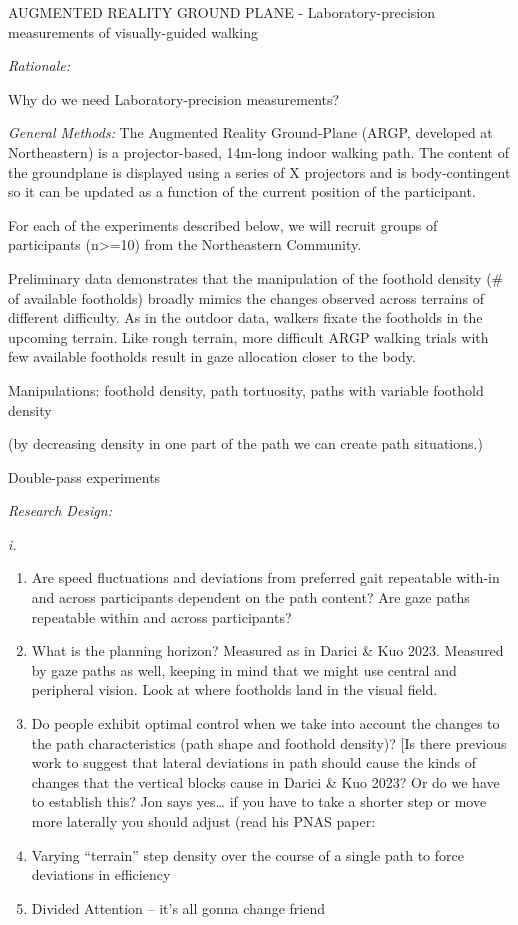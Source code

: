 AUGMENTED REALITY GROUND PLANE - Laboratory-precision measurements of
visually-guided walking

\emph{Rationale:}

Why do we need Laboratory-precision measurements?

\emph{General Methods:} The Augmented Reality Ground-Plane (ARGP,
developed at Northeastern) is a projector-based, 14m-long indoor walking
path. The content of the groundplane is displayed using a series of X
projectors and is body-contingent so it can be updated as a function of
the current position of the participant.

For each of the experiments described below, we will recruit groups of
participants (n\textgreater=10) from the Northeastern Community.

Preliminary data demonstrates that the manipulation of the foothold
density (\# of available footholds) broadly mimics the changes observed
across terrains of different difficulty. As in the outdoor data, walkers
fixate the footholds in the upcoming terrain. Like rough terrain, more
difficult ARGP walking trials with few available footholds result in
gaze allocation closer to the body.

Manipulations: foothold density, path tortuosity, paths with variable
foothold density

(by decreasing density in one part of the path we can create path
situations.)

Double-pass experiments

\emph{Research Design:}

\emph{i.}

\begin{enumerate}
\def\labelenumi{\Alph{enumi}.}
\item
  Are speed fluctuations and deviations from preferred gait repeatable
  with-in and across participants dependent on the path content? Are
  gaze paths repeatable within and across participants?
\item
  What is the planning horizon? Measured as in Darici \& Kuo 2023.
  Measured by gaze paths as well, keeping in mind that we might use
  central and peripheral vision. Look at where footholds land in the
  visual field.
\item
  Do people exhibit optimal control when we take into account the
  changes to the path characteristics (path shape and foothold density)?
  {[}Is there previous work to suggest that lateral deviations in path
  should cause the kinds of changes that the vertical blocks cause in
  Darici \& Kuo 2023? Or do we have to establish this? Jon says
  yes\ldots{} if you have to take a shorter step or move more laterally
  you should adjust (read his PNAS paper:
\item
  Varying ``terrain'' step density over the course of a single path to
  force deviations in efficiency
\item
  Divided Attention -- it's all gonna change friend
\end{enumerate}